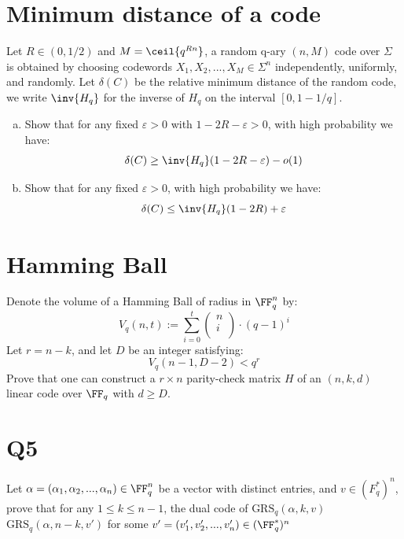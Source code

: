 \section{Minimum distance of a code}
Let \( R \in ( 0, 1/2 ) \) and \( M = \ceil{ q^{ Rn } } \), a random q-ary \( ( n, M ) \) code over \( \Sigma \) is obtained by choosing codewords \( X_1, X_2, ..., X_M \in \Sigma^n \) independently, uniformly, and randomly. Let \( \delta(C) \) be the relative minimum distance of the random code, we write \( \inv{ H_q } \) for the inverse of \( H_q \) on the interval \( [ 0, 1 - 1/q ] \).
\begin{enumerate}[(a)]
\item Show that for any fixed \( \varepsilon > 0 \) with \( 1 - 2 R - \varepsilon > 0 \), with high probability we have:
\[
    \delta(C) \ge \inv{ H_q } ( 1 - 2 R - \varepsilon ) - o (1)
\]
\item Show that for any fixed \( \varepsilon > 0 \), with high probability we have:
\[
    \delta(C) \le \inv{ H_q } ( 1 - 2R ) + \varepsilon
\]





\end{enumerate}

\section{Hamming Ball}
Denote the volume of a Hamming Ball of radius in \( \FF_q^n \) by:
\[
    V_q( n, t ) := \sum_{ i = 0 }^t \begin{pmatrix}
        n \\ 
        i \\
    \end{pmatrix} 
    \cdot 
    ( q - 1 )^i
\]
Let \( r = n - k \), and let \( D \) be an integer satisfying:
\[
    V_q( n - 1, D - 2 ) < q^r 
\]
Prove that one can construct a \( r \times n \) parity-check matrix \( H \) of an \( ( n, k, d ) \) linear code over \( \FF_q \) with \( d \ge D \).


\section{Q5}
Let \( \alpha = ( \alpha_1, \alpha_2, ..., \alpha_n ) \in \FF_q^n \) be a vector with distinct entries, and \( v \in (F^*_q)^n \), prove that for any \( 1 \le k \le n - 1 \), the dual code of \( \text{GRS}_q( \alpha, k, v ) \) \( \text{GRS}_q( \alpha, n - k, v' ) \) for some \( v' = ( v_1', v_2', ..., v_n' ) \in (\FF_q^*)^n \) 
